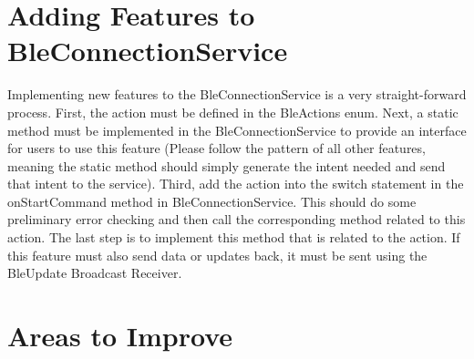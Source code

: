 \documentclass{scrreprt}
\begin{document}
\section{Adding Features to BleConnectionService}
Implementing new features to the BleConnectionService is a very straight-forward process.
First, the action must be defined in the BleActions enum. Next, a static method must be implemented
in the BleConnectionService to provide an interface for users to use this feature (Please follow the 
pattern of all other features, meaning the static method should simply generate the intent needed and
send that intent to the service). Third, add the action into the switch statement in the onStartCommand
method in BleConnectionService. This should do some preliminary error checking and then call the corresponding
method related to this action. The last step is to implement this method that is related to the action. If this
feature must also send data or updates back, it must be sent using the BleUpdate Broadcast Receiver.

\section{Areas to Improve}
\end{document}
